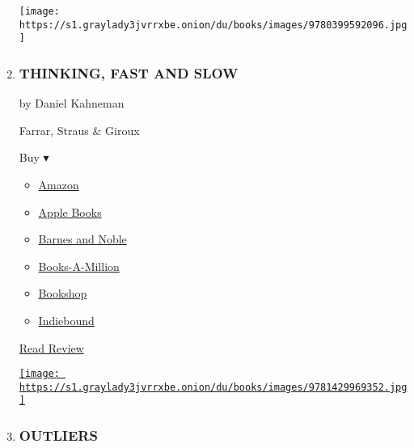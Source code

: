 \begin{enumerate}
  \texttt{[image: https://s1.graylady3jvrrxbe.onion/du/books/images/9780399592096.jpg]}
\item
  \href{https://www.nytimes3xbfgragh.onion/2011/11/27/books/review/thinking-fast-and-slow-by-daniel-kahneman-book-review.html}{}

  \hypertarget{thinking-fast-and-slow}{%
  \subsubsection{THINKING, FAST AND SLOW}\label{thinking-fast-and-slow}}

  by Daniel Kahneman

  Farrar, Straus \& Giroux

  Buy ▾

  \begin{itemize}
  \tightlist
  \item
    \href{http://www.amazon.com/Thinking-Fast-Slow-Daniel-Kahneman-ebook/dp/B00555X8OA?tag=NYTBS-20}{Amazon}
  \item
    \href{https://du-gae-books-dot-nyt-du-prd.appspot.com/buy?title=THINKING\%2C+FAST+AND+SLOW\&author=Daniel+Kahneman}{Apple
    Books}
  \item
    \href{https://www.anrdoezrs.net/click-7990613-11819508?url=https\%3A\%2F\%2Fwww.barnesandnoble.com\%2Fw\%2F\%3Fean\%3D9780374533557}{Barnes
    and Noble}
  \item
    \href{https://www.anrdoezrs.net/click-7990613-35140?url=https\%3A\%2F\%2Fwww.booksamillion.com\%2Fp\%2FTHINKING\%252C\%2BFAST\%2BAND\%2BSLOW\%2FDaniel\%2BKahneman\%2F9780374533557}{Books-A-Million}
  \item
    \href{https://bookshop.org/a/3546/9780374533557}{Bookshop}
  \item
    \href{https://www.indiebound.org/book/9780374533557?aff=NYT}{Indiebound}
  \end{itemize}

  \href{https://www.nytimes3xbfgragh.onion/2011/11/27/books/review/thinking-fast-and-slow-by-daniel-kahneman-book-review.html}{Read
  Review}

  \href{https://www.nytimes3xbfgragh.onion/2011/11/27/books/review/thinking-fast-and-slow-by-daniel-kahneman-book-review.html}{\texttt{[image: https://s1.graylady3jvrrxbe.onion/du/books/images/9781429969352.jpg]}}
\item
  \href{https://www.nytimes3xbfgragh.onion/2008/11/18/books/18kaku.html}{}

  \hypertarget{outliers}{%
  \subsubsection{OUTLIERS}\label{outliers}}


\end{enumerate}
